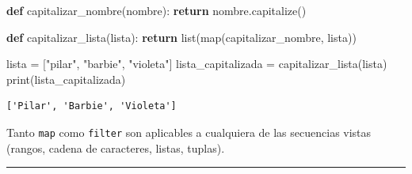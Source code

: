 \documentclass[
  letterpaper,
  DIV=11,
  numbers=noendperiod]{scrreprt}
\newenvironment{Shaded}{\begin{snugshade}}{\end{snugshade}}
\newcommand{\BuiltInTok}[1]{\textcolor[rgb]{0.00,0.23,0.31}{#1}}
\newcommand{\ControlFlowTok}[1]{\textcolor[rgb]{0.00,0.23,0.31}{\textbf{#1}}}
\newcommand{\KeywordTok}[1]{\textcolor[rgb]{0.00,0.23,0.31}{\textbf{#1}}}
\newcommand{\NormalTok}[1]{\textcolor[rgb]{0.00,0.23,0.31}{#1}}
\newcommand{\OperatorTok}[1]{\textcolor[rgb]{0.37,0.37,0.37}{#1}}
\newcommand{\StringTok}[1]{\textcolor[rgb]{0.13,0.47,0.30}{#1}}
\begin{document}
\begin{Shaded}
\begin{Highlighting}[]
\KeywordTok{def}\NormalTok{ capitalizar\_nombre(nombre):}
  \ControlFlowTok{return}\NormalTok{ nombre.capitalize()}

\KeywordTok{def}\NormalTok{ capitalizar\_lista(lista):}
  \ControlFlowTok{return} \BuiltInTok{list}\NormalTok{(}\BuiltInTok{map}\NormalTok{(capitalizar\_nombre, lista))}

\NormalTok{lista }\OperatorTok{=}\NormalTok{ [}\StringTok{"pilar"}\NormalTok{, }\StringTok{"barbie"}\NormalTok{, }\StringTok{"violeta"}\NormalTok{]}
\NormalTok{lista\_capitalizada }\OperatorTok{=}\NormalTok{ capitalizar\_lista(lista)}
\BuiltInTok{print}\NormalTok{(lista\_capitalizada)}
\end{Highlighting}
\end{Shaded}

\begin{verbatim}
['Pilar', 'Barbie', 'Violeta']
\end{verbatim}

\begin{tcolorbox}[enhanced jigsaw, opacitybacktitle=0.6, toptitle=1mm, toprule=.15mm, arc=.35mm, breakable, bottomrule=.15mm, opacityback=0, leftrule=.75mm, rightrule=.15mm, title=\textcolor{quarto-callout-note-color}{\faInfo}\hspace{0.5em}{Note}, left=2mm, bottomtitle=1mm, colframe=quarto-callout-note-color-frame, colback=white, titlerule=0mm, coltitle=black, colbacktitle=quarto-callout-note-color!10!white]

Tanto \texttt{map} como \texttt{filter} son aplicables a cualquiera de
las secuencias vistas (rangos, cadena de caracteres, listas, tuplas).

\end{tcolorbox}

\hfill\break

\begin{center}\rule{0.5\linewidth}{0.5pt}\end{center}

\hfill\break
\end{document}
